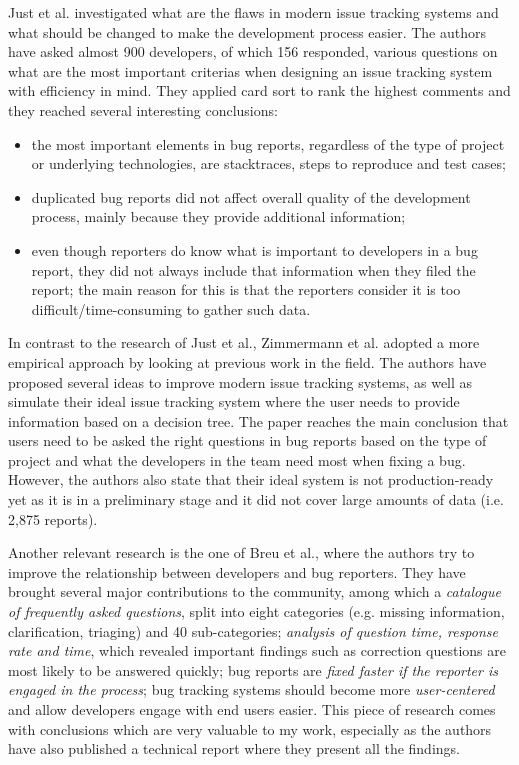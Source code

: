 \documentclass[11pt,english,twocolumn]{article}
\begin{document}
Just et al.\cite{just2008towards} investigated what are the flaws in 
modern issue tracking systems and what should be changed to make the development
process easier. The authors have asked almost 900 developers, of which
156 responded, various questions on what are the most important criterias
when designing an issue tracking system with efficiency in mind. They
applied card sort to rank the highest comments and they reached several
interesting conclusions:
  \begin{itemize}
    \item the most important elements in bug reports, regardless of the
    type of project or underlying technologies, are stacktraces, steps
    to reproduce and test cases;
    \item duplicated bug reports did not affect overall quality of the 
    development process, mainly because they provide additional information;
    \item even though reporters do know what is important to developers
    in a bug report, they did not always include that information when
    they filed the report; the main reason for this is that the reporters
    consider it is too difficult/time-consuming to gather such data.
  \end{itemize}

In contrast to the research of Just et al.\cite{just2008towards}, 
Zimmermann et al.\cite{zimmermann2009improving} adopted a more empirical
approach by looking at previous work in the field. The authors have
proposed several ideas to improve modern issue tracking systems, as well
as simulate their ideal issue tracking system where the user needs to
provide information based on a decision tree. The paper reaches the
main conclusion that users need to be asked the right questions in
bug reports based on the type of project and what the developers in the
team need most when fixing a bug. However, the authors also state that
their ideal system is not production-ready yet as it is in a preliminary
stage and it did not cover large amounts of data (i.e. 2,875 reports).

Another relevant research is the one of Breu et al.\cite{breu2010information},
where the authors try to improve the relationship between developers and
bug reporters. They have brought several major contributions to the community,
among which a \emph{catalogue of frequently asked questions}, split into
eight categories (e.g. missing information, clarification, triaging) and 
40 sub-categories; \emph{analysis of question time, response rate and time},
which revealed important findings such as correction questions are most 
likely to be answered quickly; bug reports are \emph{fixed faster if the
reporter is engaged in the process}; bug tracking systems should become
more \emph{user-centered} and allow developers engage with end users 
easier. This piece of research comes with conclusions which are very 
valuable to my work, especially as the authors have also published a 
technical report \cite{breu2009appendix} where they present all the findings.
\end{document}
